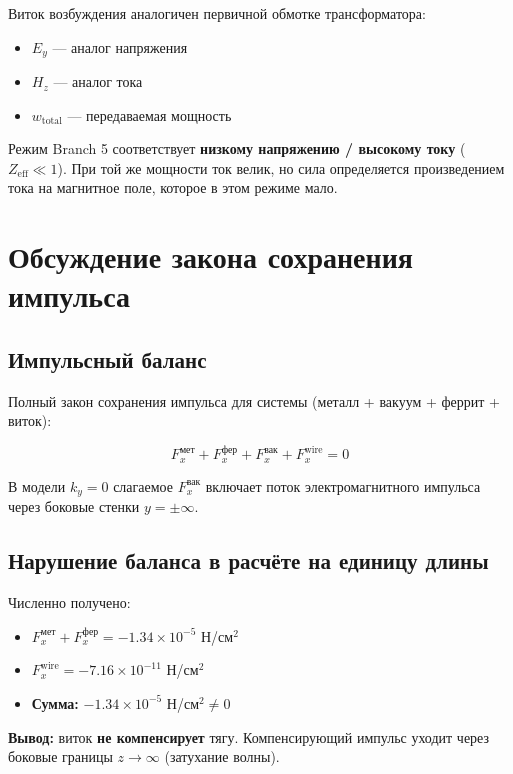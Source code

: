\documentclass[a4paper,12pt]{article}
\begin{document}
Виток возбуждения аналогичен первичной обмотке трансформатора:
\begin{itemize}
    \item $E_y$ --- аналог напряжения
    \item $H_z$ --- аналог тока
    \item $w_{\text{total}}$ --- передаваемая мощность
\end{itemize}

Режим Branch 5 соответствует \textbf{низкому напряжению / высокому току}
($Z_{\text{eff}} \ll 1$). При той же мощности ток велик, но сила определяется
произведением тока на магнитное поле, которое в этом режиме мало.

\section{Обсуждение закона сохранения импульса}

\subsection{Импульсный баланс}

Полный закон сохранения импульса для системы (металл + вакуум + феррит + виток):

\begin{equation}
F_x^{\text{мет}} + F_x^{\text{фер}} + F_x^{\text{вак}} + F_x^{\text{wire}} = 0
\end{equation}

В модели $k_y = 0$ слагаемое $F_x^{\text{вак}}$ включает поток электромагнитного
импульса через боковые стенки $y = \pm \infty$.

\subsection{Нарушение баланса в расчёте на единицу длины}

Численно получено:
\begin{itemize}
    \item $F_x^{\text{мет}} + F_x^{\text{фер}} = -1.34 \times 10^{-5}$ Н/см$^2$
    \item $F_x^{\text{wire}} = -7.16 \times 10^{-11}$ Н/см$^2$
    \item \textbf{Сумма:} $-1.34 \times 10^{-5}$ Н/см$^2 \neq 0$
\end{itemize}

\textbf{Вывод:} виток \textbf{не компенсирует} тягу. Компенсирующий импульс
уходит через боковые границы $z \to \infty$ (затухание волны).
\end{document}

